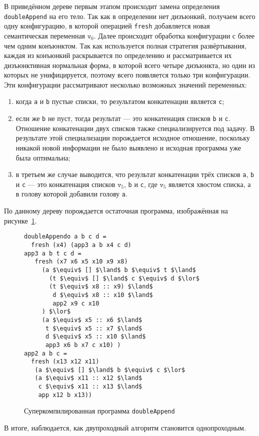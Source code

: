 В приведённом дереве первым этапом происходит замена определения \lstinline{doubleAppend}
на его тело. Так как в определении нет дизъюнкий, получаем всего одну конфигурацию,
в которой операцией \lstinline{fresh} добавляется новая семантическая переменная $\texttt{v}_0$.
Далее происходит обработка конфигурации с более чем одним конъюнктом. Так как используется
полная стратегия развёртывания, каждая из конъюнкий раскрывается по определению и
рассматривается их дизъюнктивная нормальная форма, в которой всего четыре дизъюнкта,
но один из которых не унифицируется, поэтому всего появляется только три конфигурации.
Эти конфигурации рассматривают несколько возможных значений переменных:
\begin{enumerate}
\item когда \lstinline{a} и \lstinline{b} пустые списки, то результатом конкатенации
является \lstinline{c};
\item если же \lstinline{b} не пуст, тогда результат --- это конкатенация списков \lstinline{b} и \lstinline{c}.
      Отношение конкатенации двух списков также специализируется под задачу.
      В результате этой специализации порождается исходное отношение, поскольку
      никакой новой информации не было выявлено и исходная программа уже была оптимальна;
\item в третьем же случае выводится, что результат конкатенации трёх списков
      \lstinline{a}, \lstinline{b} и \lstinline{c} --- это конкатенация
      списков $\texttt{v}_5$, \lstinline{b} и \lstinline{c}, где $\texttt{v}_5$
      является хвостом списка, а в голову которой добавили голову \lstinline{a}.
\end{enumerate}

По данному дереву порождается остаточная программа, изображённая на рисунке~\ref{fig:dappCodeOpt}.
\begin{figure}[h!]
\begin{lstlisting}
doubleAppendo a b c d =
  fresh (x4) (app3 a b x4 c d)
app3 a b t c d =
   fresh (x7 x6 x5 x10 x9 x8)
     (a $\equiv$ [] $\land$ b $\equiv$ t $\land$
       (t $\equiv$ [] $\land$ c $\equiv$ d $\lor$
       (t $\equiv$ x8 :: x9) $\land$
        d $\equiv$ x8 :: x10 $\land$
        app2 x9 c x10
     ) $\lor$
     (a $\equiv$ x5 :: x6 $\land$
      t $\equiv$ x5 :: x7 $\land$
      d $\equiv$ x5 :: x10 $\land$
      app3 x6 b x7 c x10) ) 
app2 a b c =
  fresh (x13 x12 x11)
   (a $\equiv$ [] $\land$ b $\equiv$ c $\lor$
   (a $\equiv$ x11 :: x12 $\land$
    c $\equiv$ x11 :: x13 $\land$
    app x12 b x13))
\end{lstlisting}
\caption{Суперкомпилированная программа \lstinline{doubleAppend}}
\label{fig:dappCodeOpt}
\end{figure}

В итоге, наблюдается, как двупроходный алгоритм становится однопроходным.
